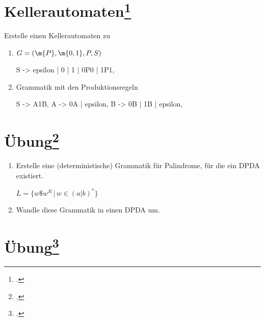 \documentclass{lehramt-informatik-aufgabe}
\begin{document}
%

\section{Kellerautomaten\footcite[Seite 27]{theo:fs:2}}

Erstelle einen Kellerautomaten zu
\begin{enumerate}
\item $G = ( \m{P} , \m{0,1} , P, S)$

\begin{liProduktionsRegeln}
S -> epsilon | 0 | 1 | 0P0 | 1P1,
\end{liProduktionsRegeln}

\item Grammatik mit den Produktionsregeln

\begin{liProduktionsRegeln}
S -> A1B,
A -> 0A | epsilon,
B -> 0B | 1B | epsilon,
\end{liProduktionsRegeln}
\end{enumerate}

%

\section{Übung\footcite[Seite 34]{theo:fs:2}}

\begin{enumerate}
\item Erstelle eine (deterministische) Grammatik für Palindrome, für die
ein DPDA existiert.

$L = \{ w \$ w^R \, | \, w \in (a|b)^* \}$

\item Wandle diese Grammatik in einen DPDA um.
\end{enumerate}

%

\section{Übung\footcite[Seite 37]{theo:fs:2}}
\end{document}
